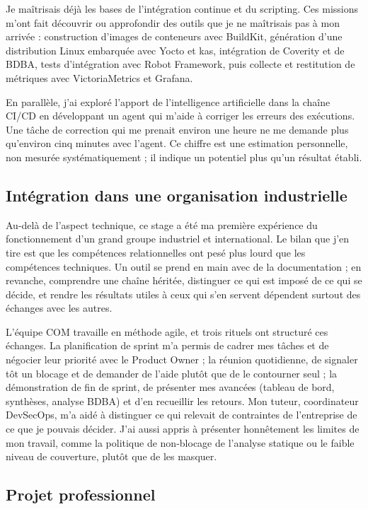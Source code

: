 Je maîtrisais déjà les bases de l'intégration continue et du scripting. Ces
missions m'ont fait découvrir ou approfondir des outils que je ne maîtrisais
pas à mon arrivée : construction d'images de conteneurs avec BuildKit,
génération d'une distribution Linux embarquée avec Yocto et kas, intégration
de Coverity et de BDBA, tests d'intégration avec Robot Framework, puis collecte
et restitution de métriques avec VictoriaMetrics et Grafana.

En parallèle, j'ai exploré l'apport de l'intelligence artificielle dans la
chaîne CI/CD en développant un agent qui m'aide à corriger les erreurs des
exécutions. Une tâche de correction qui me prenait environ une heure ne me
demande plus qu'environ cinq minutes avec l'agent. Ce chiffre est une
estimation personnelle, non mesurée systématiquement ; il indique un potentiel
plus qu'un résultat établi.

\subsection{Intégration dans une organisation industrielle}
\label{ssec:concl-apports-professionnel}

Au-delà de l'aspect technique, ce stage a été ma première expérience du
fonctionnement d'un grand groupe industriel et international. Le bilan que j'en
tire est que les compétences relationnelles ont pesé plus lourd que les
compétences techniques. Un outil se prend en main avec de la documentation ; en
revanche, comprendre une chaîne héritée, distinguer ce qui est imposé de ce qui
se décide, et rendre les résultats utiles à ceux qui s'en servent dépendent
surtout des échanges avec les autres.

L'équipe COM travaille en méthode agile, et trois rituels ont structuré ces
échanges. La planification de sprint m'a permis de cadrer mes tâches et de
négocier leur priorité avec le Product Owner ; la réunion quotidienne, de
signaler tôt un blocage et de demander de l'aide plutôt que de le contourner
seul ; la démonstration de fin de sprint, de présenter mes avancées
(tableau de bord, synthèses, analyse BDBA) et d'en recueillir les retours. Mon
tuteur, coordinateur DevSecOps, m'a aidé à distinguer ce qui relevait de
contraintes de l'entreprise de ce que je pouvais décider. J'ai aussi appris à
présenter honnêtement les limites de mon travail, comme la politique de
non-blocage de l'analyse statique ou le faible niveau de couverture, plutôt que
de les masquer.

\subsection{Projet professionnel}
\label{ssec:concl-projet-pro}

